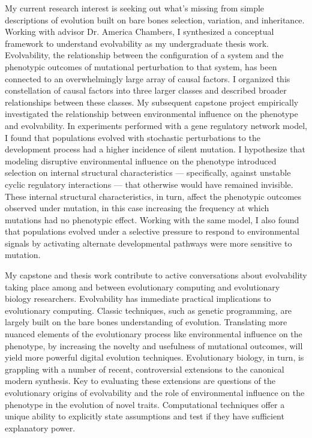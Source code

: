 My current research interest is seeking out what's missing from simple descriptions of evolution built on bare bones selection, variation, and inheritance.
Working with advisor Dr. America Chambers, I synthesized a conceptual framework to understand evolvability as my undergraduate thesis work.
Evolvability, the relationship between the configuration of a system and the phenotypic outcomes of mutational perturbation to that system, has been connected to an overwhelmingly large array of causal factors.
I organized this constellation of causal factors into three larger classes and described broader relationships between these classes.
My subsequent capstone project empirically investigated the relationship between environmental influence on the phenotype and evolvability.
In experiments performed with a gene regulatory network model, I found that populations evolved with stochastic perturbations to the development process had a higher incidence of silent mutation.
I hypothesize that modeling disruptive environmental influence on the phenotype introduced selection on internal structural characteristics --- specifically, against unstable cyclic regulatory interactions --- that otherwise would have remained invisible.
These internal structural characteristics, in turn, affect the phenotypic outcomes observed under mutation, in this case increasing the frequency at which mutations had no phenotypic effect.
Working with the same model, I also found that populations evolved under a selective pressure to respond to environmental signals by activating alternate developmental pathways were more sensitive to mutation.

My capstone and thesis work contribute to active conversations about evolvability taking place among and between evolutionary computing and evolutionary biology researchers.
Evolvability has immediate practical implications to evolutionary computing.
Classic techniques, such as genetic programming, are largely built on the bare bones understanding of evolution.
Translating more nuanced elements of the evolutionary process like environmental influence on the phenotype, by increasing the novelty and usefulness of mutational outcomes, will yield more powerful digital evolution techniques.
Evolutionary biology, in turn, is grappling with a number of recent, controversial extensions to the canonical modern synthesis.
Key to evaluating these extensions are questions of the evolutionary origins of evolvability and the role of environmental influence on the phenotype in the evolution of novel traits.
Computational techniques offer a unique ability to explicitly state assumptions and test if they have sufficient explanatory power.

